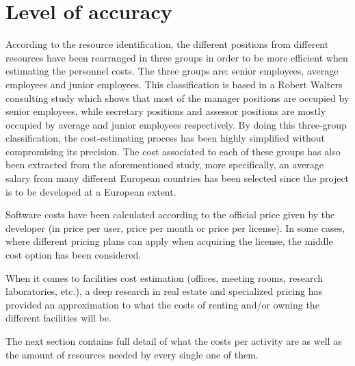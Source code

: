 \section{Level of accuracy}

According to the resource identification, the different positions from different resources have been rearranged in three groups in order to be more efficient when estimating the personnel costs. The three groups are: senior employees, average employees and junior employees. This classification is based in a Robert Walters consulting study \cite{solarSurvey} which shows that most of the manager positions are occupied by senior employees, while secretary positions and assessor positions are mostly occupied by average and junior employees respectively. By doing this three-group classification, the cost-estimating process has been highly simplified without compromising its precision. The cost associated to each of these groups has also been extracted from the aforementioned study, more specifically, an average salary from many different European countries has been selected since the project is to be developed at a European extent.

Software costs have been calculated according to the official price given by the developer (in price per user, price per month or price per license). In some cases, where different pricing plans can apply when acquiring the license, the middle cost option has been considered.   

When it comes to facilities cost estimation (offices, meeting rooms, research laboratories, etc.), a deep research in real estate and specialized pricing has provided an approximation to what the costs of renting and/or owning the different facilities will be.

The next section contains full detail of what the costs per activity are as well as the amount of resources needed by every single one of them. 
